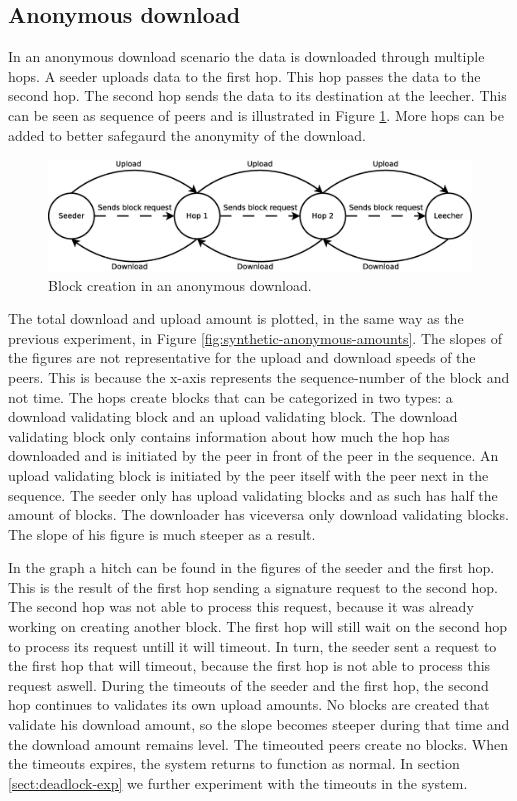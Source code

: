 \subsection{Anonymous download}
In an anonymous download scenario the data is downloaded through multiple hops.
A seeder uploads data to the first hop.
This hop passes the data to the second hop.
The second hop sends the data to its destination at the leecher.
This can be seen as sequence of peers and is illustrated in Figure \ref{fig:seeder-hops-leecher}.
More hops can be added to better safegaurd the anonymity of the download.

\begin{figure}
	\centerline{\includegraphics[scale=0.3]{experimentation/anonymous/seeder-hops-leecher.eps}}
	\caption{Block creation in an anonymous download.}
	\label{fig:seeder-hops-leecher}
\end{figure}

The total download and upload amount is plotted, in the same way as the previous experiment,
in Figure \ref{fig:synthetic-anonymous-amounts}.
The slopes of the figures are not representative for the upload and download speeds of the peers.
This is because the x-axis represents the sequence-number of the block and not time.
The hops create blocks that can be categorized in two types:
a download validating block and an upload validating block.
The download validating block only contains information about how much the hop has downloaded
and is initiated by the peer in front of the peer in the sequence.
An upload validating block is initiated by the peer itself with the peer next in the sequence.
The seeder only has upload validating blocks and as such has half the amount of blocks.
The downloader has viceversa only download validating blocks.
The slope of his figure is much steeper as a result.

In the graph a hitch can be found in the figures of the seeder and the first hop.
This is the result of the first hop sending a signature request to the second hop.
The second hop was not able to process this request,
because it was already working on creating another block.
The first hop will still wait on the second hop to process its request untill it will timeout.
In turn, the seeder sent a request to the first hop that will timeout,
because the first hop is not able to process this request aswell.
During the timeouts of the seeder and the first hop,
the second hop continues to validates its own upload amounts.
No blocks are created that validate his download amount,
so the slope becomes steeper during that time and the download amount remains level.
The timeouted peers create no blocks.
When the timeouts expires, the system returns to function as normal.
In section \ref{sect:deadlock-exp} we further experiment with the timeouts in the system.

